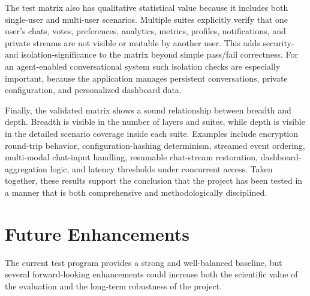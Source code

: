 \documentclass[11pt,a4paper]{report}
\begin{document}
The test matrix also has qualitative statistical value because it includes
both single-user and multi-user scenarios. Multiple suites explicitly verify
that one user's chats, votes, preferences, analytics, metrics, profiles,
notifications, and private streams are not visible or mutable by another
user. This adds security- and isolation-significance to the matrix beyond
simple pass/fail correctness. For an agent-enabled conversational system
such isolation checks are especially important, because the application
manages persistent conversations, private configuration, and personalized
dashboard data.

Finally, the validated matrix shows a sound relationship between breadth and
depth. Breadth is visible in the number of layers and suites, while depth is
visible in the detailed scenario coverage inside each suite. Examples
include encryption round-trip behavior, configuration-hashing determinism,
streamed event ordering, multi-modal chat-input handling, resumable
chat-stream restoration, dashboard-aggregation logic, and latency thresholds
under concurrent access. Taken together, these results support the
conclusion that the project has been tested in a manner that is both
comprehensive and methodologically disciplined.

\section{Future Enhancements}

The current test program provides a strong and well-balanced baseline, but
several forward-looking enhancements could increase both the scientific
value of the evaluation and the long-term robustness of the project.
\end{document}
